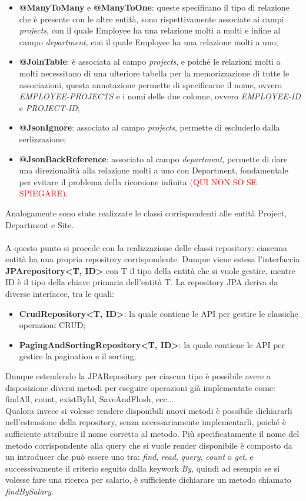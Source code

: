 \begin{itemize}
  \item \textbf{@ManyToMany} e \textbf{@ManyToOne}: queste specificano il tipo di relazione che è presente con le altre entità, sono rispettivamente associate ai campi \textit{projects}, con il quale Employee ha una relazione molti a molti e infine al campo \textit{department}, con il quale Employee ha una relazione molti a uno;
  \item \textbf{@JoinTable}: è associata al campo \textit{projects}, e poiché le relazioni molti a molti necessitano di una ulteriore tabella per la memorizzazione di tutte le associazioni, questa annotazione permette di specificarne il nome, ovvero \textit{EMPLOYEE-PROJECTS} e i nomi delle due colonne, ovvero \textit{EMPLOYEE-ID} e \textit{PROJECT-ID};
  \item \textbf{@JsonIgnore}: associato al campo \textit{projects}, permette di escluderlo dalla serlizzazione;
  \item \textbf{@JsonBackReference}: associato al campo \textit{department}, permette di dare una direzionalità alla relazione molti a uno con Department, fondamentale per evitare il problema della ricorsione infinita \textcolor{red}{(QUI NON SO SE SPIEGARE)}.
\end{itemize}
Analogamente sono state realizzate le classi corrispondenti alle entità Project, Department e Site.\\\\
A questo punto si procede con la realizzazione delle classi repository: ciascuna entità ha una propria repository corrispondente. Dunque viene estesa l'interfaccia \textbf{JPArepository<T, ID>} con T il tipo della entità che si vuole gestire, mentre ID è il tipo della chiave primaria dell'entità T. La repository JPA deriva da diverse interfacce, tra le quali:
\begin{itemize}
  \item \textbf{CrudRepository<T, ID>}: la quale contiene le API per gestire le classiche operazioni CRUD;
  \item \textbf{PagingAndSortingRepository<T, ID>}: la quale contiene le API per gestire la pagination e il sorting;
\end{itemize}
Dunque estendendo la JPARepository per ciascun tipo è possibile avere a disposizione diversi metodi per eseguire operazioni già implementate come: findAll, count, existById, SaveAndFlush, ecc...\\
Qualora invece si volesse rendere disponibili nuovi metodi è possibile dichiararli nell'estensione della repository, senza necessariamente implementarli, poiché è sufficiente attribuire il nome corretto al metodo. Più specificatamente il nome del metodo corrispondente alla query che si vuole render disponibile è composto da un introducer che può essere uno tra: \textit{find}, \textit{read}, \textit{query}, \textit{count} o \textit{get}, e successivamente il criterio seguito dalla keywork \textit{By}, quindi ad esempio se si volesse fare una ricerca per salario, è sufficiente dichiarare un metodo chiamato \textit{findBySalary}. \\
